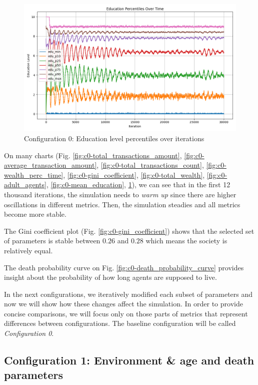 \documentclass[english]{projectreport}
\begin{document}
    \begin{figure}[H]
        \centering
        \includegraphics[width=0.8\linewidth]{metrics_config0/metrics_config0_education_perc_time.png}
        \caption{Configuration 0: Education level percentiles over iterations}
        \label{fig:c0-education_perc_time}
    \end{figure}

    On many charts (Fig. \ref{fig:c0-total_transactions_amount}, \ref{fig:c0-average_transaction_amount}, \ref{fig:c0-total_transactions_count}, \ref{fig:c0-wealth_perc_time}, \ref{fig:c0-gini_coefficient}, \ref{fig:c0-total_wealth}, \ref{fig:c0-adult_agents}, \ref{fig:c0-mean_education}, \ref{fig:c0-education_perc_time}), we can see that in the first 12 thousand iterations, the simulation needs to \textit{warm up} since there are higher oscillations in different metrics. Then, the simulation steadies and all metrics become more stable.

    The Gini coefficient plot (Fig. \ref{fig:c0-gini_coefficient}) shows that the selected set of parameters is stable between $0.26$ and $0.28$ which means the society is relatively equal.

    The death probability curve on Fig. \ref{fig:c0-death_probability_curve} provides insight about the probability of how long agents are supposed to live.

    \vspace{5mm} %

    In the next configurations, we iteratively modified each subset of parameters and now we will show how these changes affect the simulation. In order to provide concise comparisons, we will focus only on those parts of metrics that represent differences between configurations. The baseline configuration will be called \textit{Configuration 0}.

\subsection{Configuration 1: Environment \& age and death parameters}
\end{document}
